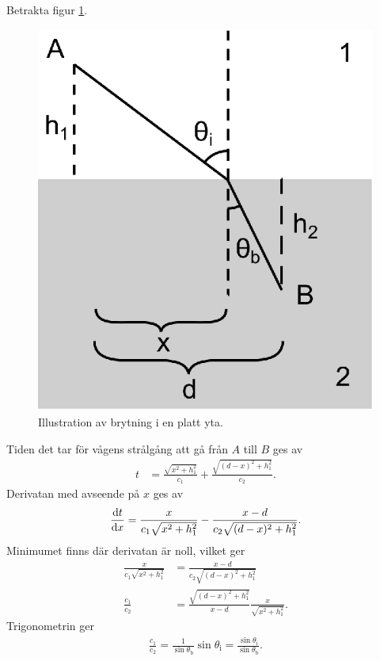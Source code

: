 \deriv
Betrakta figur \ref{fig:refraction}.
\begin{figure}[!ht]
	\centering
	\includegraphics[scale=1]{./Images/refraction/refraction.eps}
	\caption{Illustration av brytning i en platt yta.}
	\label{fig:refraction}
\end{figure}
Tiden det tar för vågens strålgång att gå från $A$ till $B$ ges av
\begin{align*}
	t &= \frac{\sqrt{x^2 + h_1^2}}{c_1} + \frac{\sqrt{(d - x)^2 + h_1^2}}{c_2}.
\end{align*}
Derivatan med avseende på $x$ ges av
\begin{align*}
	\dv{t}{x} = \frac{x}{c_1\sqrt{x^2 + h_1^2}} - \frac{x - d}{c_2\sqrt{(d - x)^2 + h_1^2}}.
\end{align*}
Minimumet finns där derivatan är noll, vilket ger
\begin{align*}
	\frac{x}{c_1\sqrt{x^2 + h_1^2}} &= \frac{x - d}{c_2\sqrt{(d - x)^2 + h_1^2}} \\
	\frac{c_1}{c_2}                 &= \frac{\sqrt{(d - x)^2 + h_1^2}}{x - d}\frac{x}{\sqrt{x^2 + h_1^2}}.
\end{align*}
Trigonometrin ger
\begin{align*}
	\frac{c_1}{c_2} = \frac{1}{\sin{\theta_{\text{b}}}}\sin{\theta_{\text{i}}} = \frac{\sin{\theta_{\text{i}}}}{\sin{\theta_{\text{b}}}}.
\end{align*}

